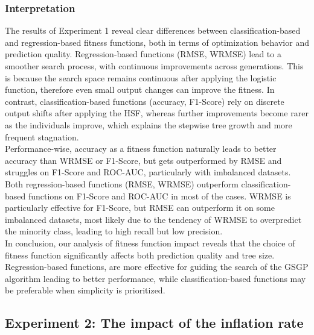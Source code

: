 \documentclass[manuscript, review, anonymous]{acmart} %
\begin{document}
\subsubsection{Interpretation}
The results of Experiment 1 reveal clear differences between classification-based and regression-based fitness functions, 
both in terms of optimization behavior and prediction quality.
Regression-based functions (RMSE, WRMSE) lead to a smoother search process, 
with continuous improvements across generations. This is because the search space remains continuous after applying the logistic function,
therefore even small output changes can improve the fitness.
In contrast, classification-based functions (accuracy, F1-Score) rely on discrete output shifts after applying the HSF, 
whereas further improvements become rarer as the individuals improve, which explains the stepwise tree growth and more frequent stagnation.\\
Performance-wise, accuracy as a fitness function naturally leads to better accuracy than WRMSE or F1-Score,
but gets outperformed by RMSE and struggles on F1-Score and ROC-AUC, 
particularly with imbalanced datasets. 
Both regression-based functions (RMSE, WRMSE) outperform classification-based functions on F1-Score and ROC-AUC in most of the cases.
WRMSE is particularly effective for F1-Score, but RMSE can outperform it on some imbalanced datasets, most likely due to the tendency
of WRMSE to overpredict the minority class, leading to high recall but low precision.\\
In conclusion, our analysis of fitness function impact reveals that 
the choice of fitness function significantly affects both prediction quality and tree size. 
Regression-based functions, are more effective for guiding the search of the GSGP algorithm leading to better performance, 
while classification-based functions may be preferable when simplicity is prioritized.

\subsection{Experiment 2: The impact of the inflation rate}
\label{sec:exp2}
\end{document}

